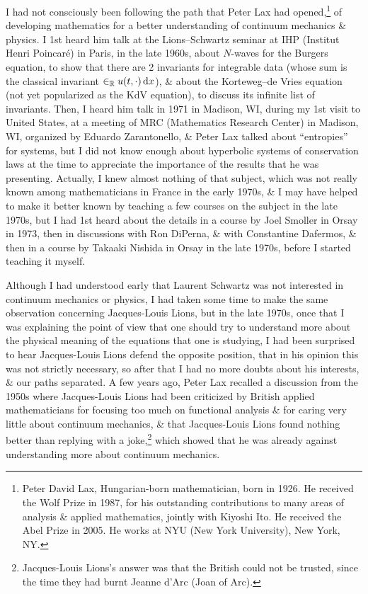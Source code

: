 \documentclass{article}
\begin{document}
\begin{enumerate}
	I had not consciously been following the path that {\sc Peter Lax} had opened,\footnote{{\sc Peter David Lax}, Hungarian-born mathematician, born in 1926. He received the Wolf Prize in 1987, for his outstanding contributions to many areas of analysis \& applied mathematics, jointly with {\sc Kiyoshi Ito}. He received the Abel Prize in 2005. He works at NYU (New York University), New York, NY.} of developing mathematics for a better understanding of continuum mechanics \& physics. I 1st heard him talk at the Lions--Schwartz seminar at IHP (Institut Henri Poincaré) in Paris, in the late 1960s, about $N$-waves for the Burgers equation, to show that there are 2 invariants for integrable data (whose sum is the classical invariant $\in_\mathbb{R} u(t,\cdot)\,{\rm d}x$), \& about the Korteweg--de Vries equation (not yet popularized as the KdV equation), to discuss its infinite list of invariants. Then, I heard him talk in 1971 in Madison, WI, during my 1st visit to United States, at a meeting of MRC (Mathematics Research Center) in Madison, WI, organized by {\sc Eduardo Zarantonello}, \& {\sc Peter Lax} talked about ``entropies'' for systems, but I did not know enough about hyperbolic systems of conservation laws at the time to appreciate the importance of the results that he was presenting. Actually, I knew almost nothing of that subject, which was not really known among mathematicians in France in the early 1970s, \& I may have helped to make it better known by teaching a few courses on the subject in the late 1970s, but I had 1st heard about the details in a course by {\sc Joel Smoller} in Orsay in 1973, then in discussions with {\sc Ron DiPerna}, \& with {\sc Constantine Dafermos}, \& then in a course by {\sc Takaaki Nishida} in Orsay in the late 1970s, before I started teaching it myself.
	
	Although I had understood early that {\sc Laurent Schwartz} was not interested in continuum mechanics or physics, I had taken some time to make the same observation concerning {\sc Jacques-Louis Lions}, but in the late 1970s, once that I was explaining the point of view that one should try to understand more about the physical meaning of the equations that one is studying, I had been surprised to hear {\sc Jacques-Louis Lions} defend the opposite position, that in his opinion this was not strictly necessary, so after that I had no more doubts about his interests, \& our paths separated. A few years ago, {\sc Peter Lax} recalled a discussion from the 1950s where {\sc Jacques-Louis Lions} had been criticized by British applied mathematicians for focusing too much on functional analysis \& for caring very little about continuum mechanics, \& that {\sc Jacques-Louis Lions} found nothing better than replying with a joke,\footnote{{\sc Jacques-Louis Lions}'s answer was that the British could not be trusted, since the time they had burnt {\sc Jeanne d'Arc} (Joan of {\sc Arc}).} which showed that he was already against understanding more about continuum mechanics.
	

\end{enumerate}
\end{document}
